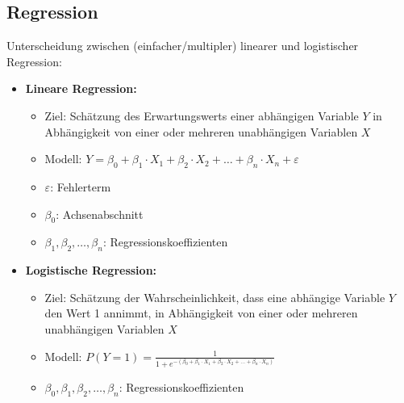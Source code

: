 \subsection{Regression}

Unterscheidung zwischen (einfacher/multipler) linearer und logistischer Regression:

\begin{itemize}
    \item \textbf{Lineare Regression:}
    \begin{itemize}
        \item Ziel: Schätzung des Erwartungswerts einer abhängigen Variable \(Y\) in Abhängigkeit von einer oder mehreren unabhängigen Variablen \(X\)
        \item Modell: \(Y = \beta_0 + \beta_1 \cdot X_1 + \beta_2 \cdot X_2 + \ldots + \beta_n \cdot X_n + \varepsilon\)
        \item \(\varepsilon\): Fehlerterm
        \item \(\beta_0\): Achsenabschnitt
        \item \(\beta_1, \beta_2, \ldots, \beta_n\): Regressionskoeffizienten
    \end{itemize}
    \item \textbf{Logistische Regression:}
    \begin{itemize}
        \item Ziel: Schätzung der Wahrscheinlichkeit, dass eine abhängige Variable \(Y\) den Wert 1 annimmt, in Abhängigkeit von einer oder mehreren unabhängigen Variablen \(X\)
        \item Modell: \(P(Y=1) = \frac{1}{1+e^{-(\beta_0 + \beta_1 \cdot X_1 + \beta_2 \cdot X_2 + \ldots + \beta_n \cdot X_n)}}\)
        \item \(\beta_0, \beta_1, \beta_2, \ldots, \beta_n\): Regressionskoeffizienten
    \end{itemize}
\end{itemize}